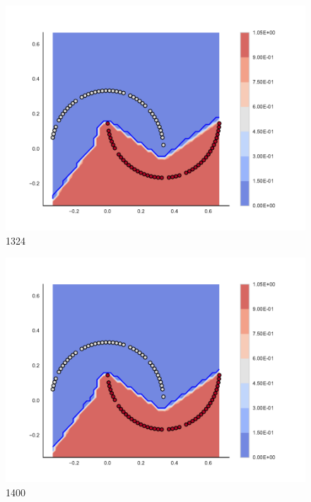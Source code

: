 \begin{subfigure}[b]{0.09\textwidth}
    \includegraphics[clip, trim=2.35cm 1.75cm 4.5cm 0cm,width=\textwidth]{img/convergence/1324.pdf}
    \caption{1324}
    \label{fig:convergence_1324}
\end{subfigure}
%
\begin{subfigure}[b]{0.09\textwidth}
    \includegraphics[clip, trim=2.35cm 1.75cm 4.5cm 0cm,width=\textwidth]{img/convergence/1400.pdf}
    \caption{1400}
    \label{fig:convergence_1400}
\end{subfigure}
%
